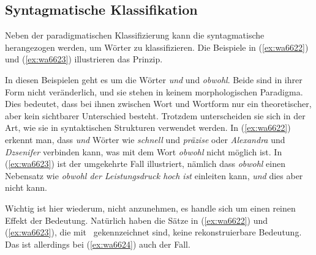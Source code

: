 \subsection{Syntagmatische Klassifikation}

\label{sec:syntagmatischeklassifikation}

Neben der paradigmatischen Klassifizierung kann die syntagmatische herangezogen werden, um Wörter zu klassifizieren.
Die Beispiele in (\ref{ex:wa6622}) und (\ref{ex:wa6623}) illustrieren das Prinzip.

\begin{exe}
  \ex\label{ex:wa6622}
  \begin{xlist}
  \end{xlist}
  \ex\label{ex:wa6623}
  \begin{xlist}
  \end{xlist}
\end{exe}

In diesen Beispielen geht es um die Wörter \textit{und} und \textit{obwohl}.
Beide sind in ihrer Form nicht veränderlich, und sie stehen in keinem morphologischen Paradigma.
Dies bedeutet, dass bei ihnen zwischen Wort und Wortform nur ein theoretischer, aber kein sichtbarer Unterschied besteht.
Trotzdem unterscheiden sie sich in der Art, wie sie in syntaktischen Strukturen verwendet werden.
In (\ref{ex:wa6622}) erkennt man, dass \textit{und} Wörter wie \textit{schnell} und \textit{präzise} oder \textit{Alexandra} und \textit{Dzsenifer} verbinden kann, was mit dem Wort \textit{obwohl} nicht möglich ist.
In (\ref{ex:wa6623}) ist der umgekehrte Fall illustriert, nämlich dass \textit{obwohl} einen Nebensatz wie \textit{obwohl der Leistungsdruck hoch ist} einleiten kann, \textit{und} dies aber nicht kann.

Wichtig ist hier wiederum, nicht anzunehmen, es handle sich um einen reinen Effekt der Bedeutung.
Natürlich haben die Sätze in (\ref{ex:wa6622}) und (\ref{ex:wa6623}), die mit \Ast\ gekennzeichnet sind, keine rekonstruierbare Bedeutung.
Das ist allerdings bei (\ref{ex:wa6624}) auch der Fall.

